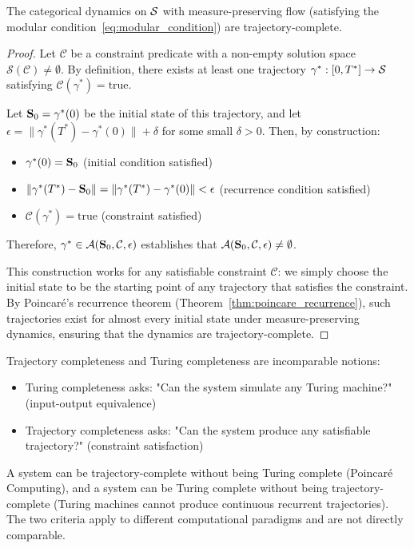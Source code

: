 \begin{theorem}
\label{thm:trajectory_complete}
The categorical dynamics on $\mathcal{S}$ with measure-preserving flow (satisfying the modular condition~\eqref{eq:modular_condition}) are trajectory-complete.
\end{theorem}

\begin{proof}
Let $\mathcal{C}$ be a constraint predicate with a non-empty solution space $\mathcal{S}(\mathcal{C}) \neq \emptyset$. By definition, there exists at least one trajectory $\gamma^*: [0, T^*] \to \mathcal{S}$ satisfying $\mathcal{C}(\gamma^*) = \text{true}$.

Let $\mathbf{S}_0 = \gamma^*(0)$ be the initial state of this trajectory, and let $\epsilon = \|\gamma^*(T^*) - \gamma^*(0)\| + \delta$ for some small $\delta > 0$. Then, by construction:
\begin{itemize}
    \item $\gamma^*(0) = \mathbf{S}_0$ (initial condition satisfied)
    \item $\|\gamma^*(T^*) - \mathbf{S}_0\| = \|\gamma^*(T^*) - \gamma^*(0)\| < \epsilon$ (recurrence condition satisfied)
    \item $\mathcal{C}(\gamma^*) = \text{true}$ (constraint satisfied)
\end{itemize}

Therefore, $\gamma^* \in \mathcal{A}(\mathbf{S}_0, \mathcal{C}, \epsilon)$ establishes that $\mathcal{A}(\mathbf{S}_0, \mathcal{C}, \epsilon) \neq \emptyset$.

This construction works for any satisfiable constraint $\mathcal{C}$: we simply choose the initial state to be the starting point of any trajectory that satisfies the constraint. By Poincaré's recurrence theorem (Theorem~\ref{thm:poincare_recurrence}), such trajectories exist for almost every initial state under measure-preserving dynamics, ensuring that the dynamics are trajectory-complete.
\end{proof}

\begin{remark}
\label{rem:completeness_comparison}
Trajectory completeness and Turing completeness are incomparable notions:
\begin{itemize}
    \item Turing completeness asks: "Can the system simulate any Turing machine?" (input-output equivalence)
    \item Trajectory completeness asks: "Can the system produce any satisfiable trajectory?" (constraint satisfaction)
\end{itemize}
A system can be trajectory-complete without being Turing complete (Poincaré Computing), and a system can be Turing complete without being trajectory-complete (Turing machines cannot produce continuous recurrent trajectories). The two criteria apply to different computational paradigms and are not directly comparable.
\end{remark}

